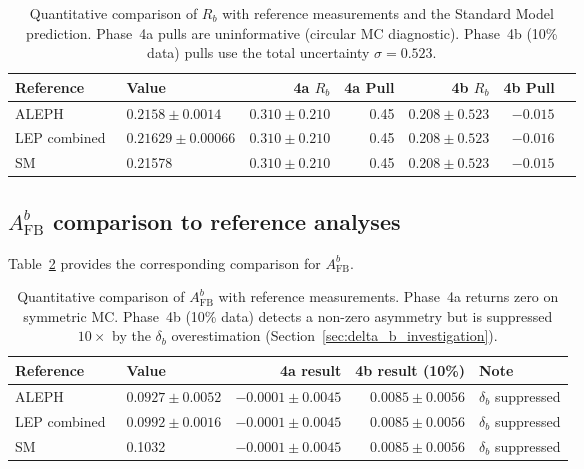 \documentclass[11pt,a4paper]{article}
\begin{document}
\begin{table}[htbp]
\centering
\caption{Quantitative comparison of $R_b$ with reference measurements
and the Standard Model prediction. Phase~4a pulls are uninformative (circular MC
diagnostic). Phase~4b (10\% data) pulls use the total uncertainty $\sigma = 0.523$.}
\label{tab:rb_comparison}
\begin{tabular}{llrrrrr}
\toprule
Reference & Value & 4a $R_b$ & 4a Pull & 4b $R_b$ & 4b Pull \\
\midrule
ALEPH~\cite{ALEPH:Rb:1996} & $0.2158 \pm 0.0014$ & $0.310 \pm 0.210$ & 0.45 & $0.208 \pm 0.523$ & $-0.015$ \\
LEP combined~\cite{LEP:EWWG:2005} & $0.21629 \pm 0.00066$ & $0.310 \pm 0.210$ & 0.45 & $0.208 \pm 0.523$ & $-0.016$ \\
SM~\cite{LEP:EWWG:2005} & 0.21578 & $0.310 \pm 0.210$ & 0.45 & $0.208 \pm 0.523$ & $-0.015$ \\
\bottomrule
\end{tabular}
\end{table}

\subsection{$A_\mathrm{FB}^b$ comparison to reference analyses}
\label{sec:afb_comparison_detail}

Table~\ref{tab:afb_comparison} provides the corresponding comparison for $A_\mathrm{FB}^b$.

\begin{table}[htbp]
\centering
\caption{Quantitative comparison of $A_\mathrm{FB}^b$ with reference measurements.
Phase~4a returns zero on symmetric MC. Phase~4b (10\% data) detects a non-zero
asymmetry but is suppressed $10\times$ by the $\delta_b$ overestimation
(Section~\ref{sec:delta_b_investigation}).}
\label{tab:afb_comparison}
\begin{tabular}{llrrl}
\toprule
Reference & Value & 4a result & 4b result (10\%) & Note \\
\midrule
ALEPH~\cite{ALEPH:AFBb} & $0.0927 \pm 0.0052$ & $-0.0001 \pm 0.0045$ & $0.0085 \pm 0.0056$ & $\delta_b$ suppressed \\
LEP combined~\cite{LEP:EWWG:2005} & $0.0992 \pm 0.0016$ & $-0.0001 \pm 0.0045$ & $0.0085 \pm 0.0056$ & $\delta_b$ suppressed \\
SM~\cite{LEP:EWWG:2005} & 0.1032 & $-0.0001 \pm 0.0045$ & $0.0085 \pm 0.0056$ & $\delta_b$ suppressed \\
\bottomrule
\end{tabular}
\end{table}
\end{document}
